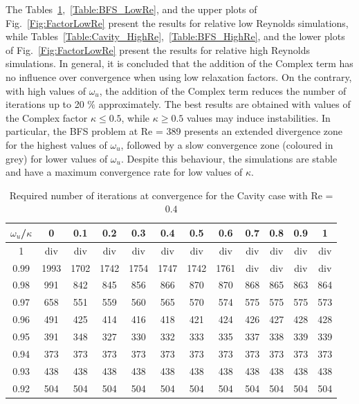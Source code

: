 \documentclass[final,3p,times,11pt,onecolumn]{myElsarticle}
\numberwithin{equation}{section}
\begin{document}
The Tables~\ref{Table:Cavity_LowRe},~\ref{Table:BFS_LowRe}, and the upper plots of Fig.~\ref{Fig:FactorLowRe} present the results for relative low Reynolds simulations, while Tables~\ref{Table:Cavity_HighRe},~\ref{Table:BFS_HighRe}, and the lower plots of Fig.~\ref{Fig:FactorLowRe} present the results for relative high Reynolds simulations. In general, it is concluded that the addition of the Complex term has no influence over convergence when using low relaxation factors. On the contrary, with high values of $\omega_u$, the addition of the Complex term reduces the number of iterations up to 20 $\%$ approximately. The best results are obtained with values of the Complex factor $\kappa \leq 0.5$, while $\kappa \geq 0.5$ values may induce instabilities. In particular, the BFS problem at Re = 389 presents an extended divergence zone for the highest values of $\omega_u$, followed by a slow convergence zone (coloured in grey) for lower values of $\omega_u$. Despite this behaviour, the simulations are stable and have a maximum convergence rate for low values of $\kappa$.
\begin{table}[b!!]
\centering
\begin{tabular}{c|ccccccccccc}
\hline 
$\omega_u$/$\kappa$ & 0 & 0.1 & 0.2 & 0.3 & 0.4 & 0.5 & 0.6 & 0.7 & 0.8 & 0.9 & 1 \\ 
\hline 
1 & div & div & div & div & div & div & div & div & div & div & div \\ 
0.99 & 1993 & 1702 & 1742 & 1754 & 1747 & 1742 & 1761 & div & div & div & div \\ 
0.98 & 991 & 842  & 845 & 856 & 866 & 870 & 870 & 868 & 865 & 863 & 864 \\ 
0.97 & 658 & 551  & 559 & 560 & 565 & 570 & 574 & 575 & 575 & 575 & 573 \\ 
0.96 & 491 &425  & 414 & 416 & 418 & 421 & 424 & 426 & 427 & 428 & 428 \\ 
0.95 & 391 & 348 & 327 & 330 & 332 & 333 & 335 & 337 & 338 & 339 & 339 \\ 
0.94 & 373 & 373 & 373 & 373 & 373 & 373 & 373 & 373 & 373 & 373 & 373 \\ 
0.93 & 438 & 438 & 438 & 438 & 438 & 438 & 438 & 438 & 438 & 438 & 438 \\ 
0.92 & 504 & 504 & 504 & 504 & 504 & 504 & 504 & 504 & 504 & 504 & 504 \\ 
\hline 
\end{tabular} 
\caption{Required number of iterations at convergence for the Cavity case with Re = $0.4$}
\label{Table:Cavity_LowRe}
\end{table}
\end{document}
